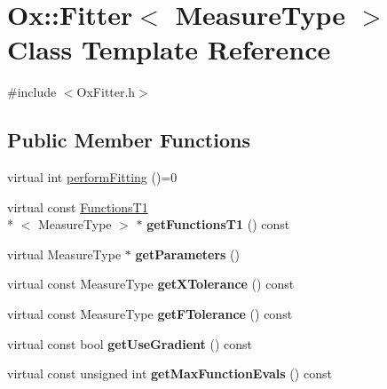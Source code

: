 \hypertarget{class_ox_1_1_fitter}{\section{Ox\-:\-:Fitter$<$ Measure\-Type $>$ Class Template Reference}
\label{class_ox_1_1_fitter}
}


{\ttfamily \#include $<$Ox\-Fitter.\-h$>$}

\subsection*{Public Member Functions}
\begin{DoxyCompactItemize}
\item 
virtual int \hyperlink{class_ox_1_1_fitter_a8f240f0da86d06b339ab2747e87f21b9}{perform\-Fitting} ()=0
\item 
\hypertarget{class_ox_1_1_fitter_a859dc8c25c99b37f47d41e086b97c897}{virtual const \hyperlink{class_ox_1_1_functions_t1}{Functions\-T1}\\*
$<$ Measure\-Type $>$ $\ast$ {\bfseries get\-Functions\-T1} () const }\label{class_ox_1_1_fitter_a859dc8c25c99b37f47d41e086b97c897}

\item 
\hypertarget{class_ox_1_1_fitter_a5e87dd37738745f98d904865f6b89219}{virtual Measure\-Type $\ast$ {\bfseries get\-Parameters} ()}\label{class_ox_1_1_fitter_a5e87dd37738745f98d904865f6b89219}

\item 
\hypertarget{class_ox_1_1_fitter_a21f92547f664c9b6f3fa8da4c7d16965}{virtual const Measure\-Type {\bfseries get\-X\-Tolerance} () const }\label{class_ox_1_1_fitter_a21f92547f664c9b6f3fa8da4c7d16965}

\item 
\hypertarget{class_ox_1_1_fitter_ac62bf275718aafc95b5e49d0aa9fc1ef}{virtual const Measure\-Type {\bfseries get\-F\-Tolerance} () const }\label{class_ox_1_1_fitter_ac62bf275718aafc95b5e49d0aa9fc1ef}

\item 
\hypertarget{class_ox_1_1_fitter_aba3fc8ad5260390faf59e2f904ab6d6d}{virtual const bool {\bfseries get\-Use\-Gradient} () const }\label{class_ox_1_1_fitter_aba3fc8ad5260390faf59e2f904ab6d6d}

\item 
\hypertarget{class_ox_1_1_fitter_a04f36e075f86c6a89df833d17b9f029d}{virtual const unsigned int {\bfseries get\-Max\-Function\-Evals} () const }\label{class_ox_1_1_fitter_a04f36e075f86c6a89df833d17b9f029d}


\end{DoxyCompactItemize}
